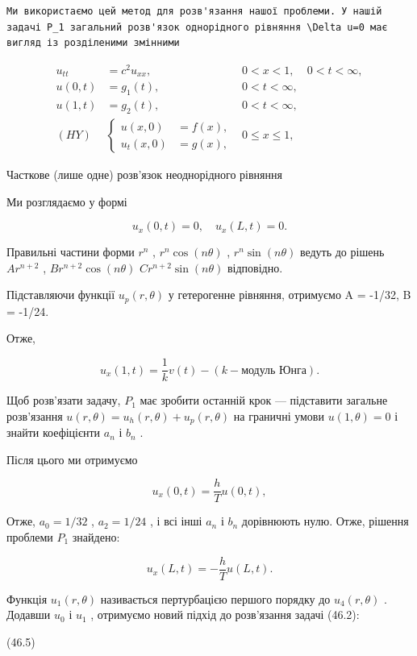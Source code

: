 \documentclass[
  ukrainian,
]{article}
\begin{document}
\begin{verbatim}
Ми використаємо цей метод для розв'язання нашої проблеми. У нашій задачі P_1 загальний розв'язок однорідного рівняння \Delta u=0 має вигляд із розділеними змінними
\end{verbatim}

\[
\begin{aligned} u_{tt} &= c^2 u_{xx}, & 0 < x < 1, & 0 < t < \infty, \\ u(0, t) &= g_1(t), & 0 < t < \infty, \\ u(1, t) &= g_2(t), & 0 < t < \infty, \\ (HY) &\begin{cases} u(x, 0) &= f(x), \\ u_t(x, 0) &= g(x), \end{cases} & 0 \leqslant x \leqslant 1, \end{aligned}
\]

Часткове (лише одне) розв'язок неоднорідного рівняння

Ми розглядаємо у формі

\[
u_x(0, t) = 0, \quad u_x(L, t) = 0.
\]

Правильні частини форми \(r^n\) , \(r^n \cos{(n\theta)}\) ,
\(r^n \sin{(n\theta)}\) ведуть до рішень \(Ar^{n+2}\) ,
\(Br^{n+2} \cos{(n\theta)}\) \(Cr^{n+2} \sin{(n\theta)}\) відповідно.

Підставляючи функції \(u_p(r, \theta)\) у гетерогенне рівняння,
отримуємо A = -1/32, B = -1/24.

Отже,

\[
u_{x}(1, t) = \frac{1}{k} v(t) - (k - \text{модуль Юнга}).
\]

Щоб розв'язати задачу, \(P_1\) має зробити останній крок --- підставити
загальне розв'язання \(u(r, \theta) = u_h(r, \theta) + u_p(r, \theta)\)
на граничні умови \(u(1, \theta) = 0\) і знайти коефіцієнти \(a_n\) і
\(b_n\) .

Після цього ми отримуємо

\[
u_{x}(0, t) = \frac{h}{T} u(0, t),
\]

Отже, \(a_0=1/32\) , \(a_2=1/24\) , і всі інші \(a_n\) і \(b_n\)
дорівнюють нулю. Отже, рішення проблеми \(P_1\) знайдено:

\[
u_{x}(L, t) = -\frac{h}{T} u(L, t).
\]

Функція \(u_1(r, \theta)\) називається пертурбацією першого порядку до
\(u_4(r, \theta)\) . Додавши \(u_0\) і \(u_1\) , отримуємо новий підхід
до розв'язання задачі (46.2):

(46.5)
\end{document}
